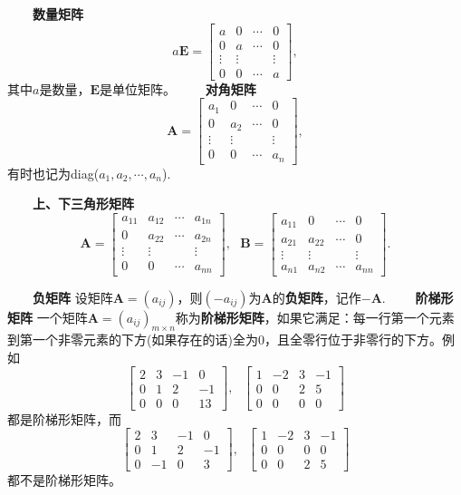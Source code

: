 \documentclass[compress,mathserif,cjk]{beamer}
\theoremstyle{remark}
\numberwithin{equation}{section}
\newcommand{\hei}{\bf}      %
\begin{document}
\begin{CJK}{UTF8}{gbsn}
\begin{frame}
 \ \ \ \ {\hei 数量矩阵} $$a\bm E=\left[\begin{matrix}a&0&\cdots&0\\0&a&\cdots&0\\ \vdots&\vdots&&\vdots\\0&0&\cdots&a\end{matrix}\right],$$
 其中$a$是数量，$\bm E$是单位矩阵。
 \pause\vskip 5pt
 \ \ \ \ {\hei 对角矩阵} $$\bm A=\left[\begin{matrix}a_1&0&\cdots&0\\0&a_2&\cdots&0\\ \vdots&\vdots&&\vdots\\0&0&\cdots&a_n\end{matrix}\right],$$
 有时也记为diag($a_1,a_2,\cdots,a_n$).
\end{frame}

\begin{frame}
 \ \ \ \ {\hei 上、下三角形矩阵} $$\bm A=\left[\begin{matrix}a_{11}&a_{12}&\cdots&a_{1n}\\0&a_{22}&\cdots&a_{2n}\\ \vdots&\vdots&&\vdots\\0&0&\cdots&a_{nn}\end{matrix}\right],~~~
 \bm B=\left[\begin{matrix}a_{11}&0&\cdots&0\\a_{21}&a_{22}&\cdots&0\\ \vdots&\vdots&&\vdots\\a_{n1}&a_{n2}&\cdots&a_{nn}\end{matrix}\right].$$
\end{frame}

\begin{frame}
 \ \ \ \ {\hei 负矩阵} 设矩阵$\bm A=(a_{ij})$，则$(-a_{ij})$为$\bm A$的{\hei 负矩阵}，记作$-\bm A$.
 \pause\vskip 5pt
 \ \ \ \ {\hei 阶梯形矩阵} 一个矩阵$\bm A=(a_{ij})_{m\times n}$称为{\hei 阶梯形矩阵}，如果它满足：每一行第一个元素到第一个非零元素的下方(如果存在的话)全为0，且全零行位于非零行的下方。例如
 $$\left[\begin{matrix}2&3&-1&0\\0&1&2&-1\\0&0&0&13\end{matrix}\right],~~~\left[\begin{matrix}1&-2&3&-1\\0&0&2&5\\0&0&0&0\end{matrix}\right]$$
 都是阶梯形矩阵，\pause 而
 $$\left[\begin{matrix}2&3&-1&0\\0&1&2&-1\\0&-1&0&3\end{matrix}\right],~~~\left[\begin{matrix}1&-2&3&-1\\0&0&0&0\\0&0&2&5\end{matrix}\right]$$
 都不是阶梯形矩阵。
\end{frame}


\end{CJK}
\end{document}
